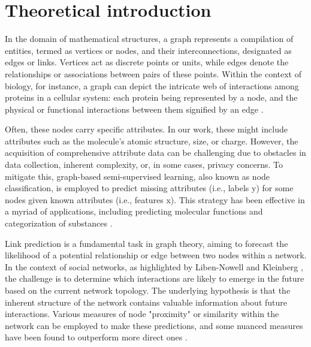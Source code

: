 \documentclass[
11pt, %
oneside, %
english, %
singlespacing, %
headsepline, %
chapterinoneline, %
]{MastersDoctoralThesis} %
\begin{document}
\chapter{Theoretical introduction}\label{chap:Theoretical introduction}
In the domain of mathematical structures, a graph represents a compilation of entities, termed as vertices or nodes, and their interconnections, designated as edges or links. Vertices act as discrete points or units, while edges denote the relationships or associations between pairs of these points. Within the context of biology, for instance, a graph can depict the intricate web of interactions among proteins in a cellular system: each protein being represented by a node, and the physical or functional interactions between them signified by an edge \cite{trudeauIntroductionGraphTheory1993}. 

Often, these nodes carry specific attributes. In our work, these might include attributes such as the molecule's atomic structure, size, or charge. However, the acquisition of comprehensive attribute data can be challenging due to obstacles in data collection, inherent complexity, or, in some cases, privacy concerns. To mitigate this, graph-based semi-supervised learning, also known as node classification, is employed to predict missing attributes (i.e., labels y) for some nodes given known attributes (i.e., features x). This strategy has been effective in a myriad of applications, including predicting molecular functions and categorization of substances \cite{NIPS2016_390e9825, liDeeperInsightsGraph2018}.

Link prediction is a fundamental task in graph theory, aiming to forecast the likelihood of a potential relationship or edge between two nodes within a network. In the context of social networks, as highlighted by Liben-Nowell and Kleinberg \cite{liben-nowellLinkPredictionProblem2003}, the challenge is to determine which interactions are likely to emerge in the future based on the current network topology. The underlying hypothesis is that the inherent structure of the network contains valuable information about future interactions. Various measures of node "proximity" or similarity within the network can be employed to make these predictions, and some nuanced measures have been found to outperform more direct ones \cite{zhangLinkPredictionBased2018}.
\end{document}
